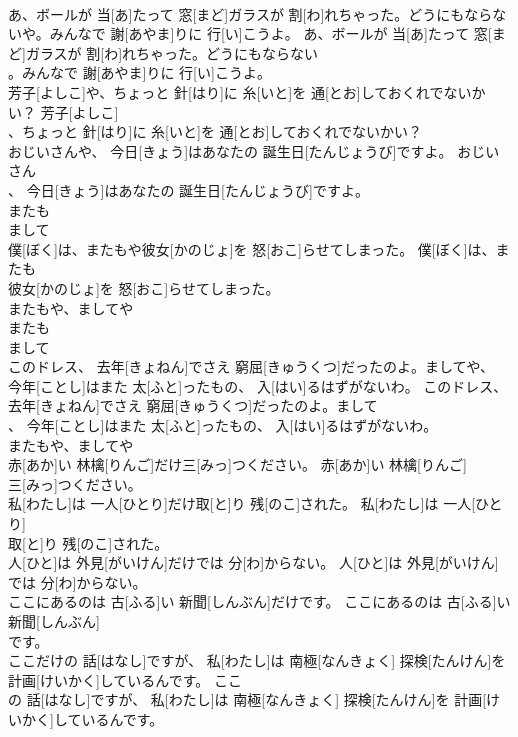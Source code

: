 \documentclass[8pt]{extreport}
\begin{document}
\begin{CJK}{UTF8}{min}
\\	あ、ボールが 当[あ]たって 窓[まど]ガラスが 割[わ]れちゃった。どうにもならないや。みんなで 謝[あやま]りに 行[い]こうよ。	あ、ボールが 当[あ]たって 窓[まど]ガラスが 割[わ]れちゃった。どうにもならない
\\	。みんなで 謝[あやま]りに 行[い]こうよ。	
\\	芳子[よしこ]や、ちょっと 針[はり]に 糸[いと]を 通[とお]しておくれでないかい？	芳子[よしこ]
\\	、ちょっと 針[はり]に 糸[いと]を 通[とお]しておくれでないかい？	
\\	おじいさんや、 今日[きょう]はあなたの 誕生日[たんじょうび]ですよ。	おじいさん
\\	、 今日[きょう]はあなたの 誕生日[たんじょうび]ですよ。	
\\	またも
\\	まして
\\	僕[ぼく]は、またもや彼女[かのじょ]を 怒[おこ]らせてしまった。	僕[ぼく]は、またも
\\	彼女[かのじょ]を 怒[おこ]らせてしまった。	
\\	またもや、ましてや
\\	またも
\\	まして
\\	このドレス、 去年[きょねん]でさえ 窮屈[きゅうくつ]だったのよ。ましてや、 今年[ことし]はまた 太[ふと]ったもの、 入[はい]るはずがないわ。	このドレス、 去年[きょねん]でさえ 窮屈[きゅうくつ]だったのよ。まして
\\	、 今年[ことし]はまた 太[ふと]ったもの、 入[はい]るはずがないわ。	
\\	またもや、ましてや
\\	赤[あか]い 林檎[りんご]だけ三[みっ]つください。	赤[あか]い 林檎[りんご]
\\	三[みっ]つください。	
\\	私[わたし]は 一人[ひとり]だけ取[と]り 残[のこ]された。	私[わたし]は 一人[ひとり]
\\	取[と]り 残[のこ]された。	
\\	人[ひと]は 外見[がいけん]だけでは 分[わ]からない。	人[ひと]は 外見[がいけん]
\\	では 分[わ]からない。	
\\	ここにあるのは 古[ふる]い 新聞[しんぶん]だけです。	ここにあるのは 古[ふる]い 新聞[しんぶん]
\\	です。	
\\	ここだけの 話[はなし]ですが、 私[わたし]は 南極[なんきょく] 探検[たんけん]を 計画[けいかく]しているんです。	ここ
\\	の 話[はなし]ですが、 私[わたし]は 南極[なんきょく] 探検[たんけん]を 計画[けいかく]しているんです。	

\end{CJK}
\end{document}

